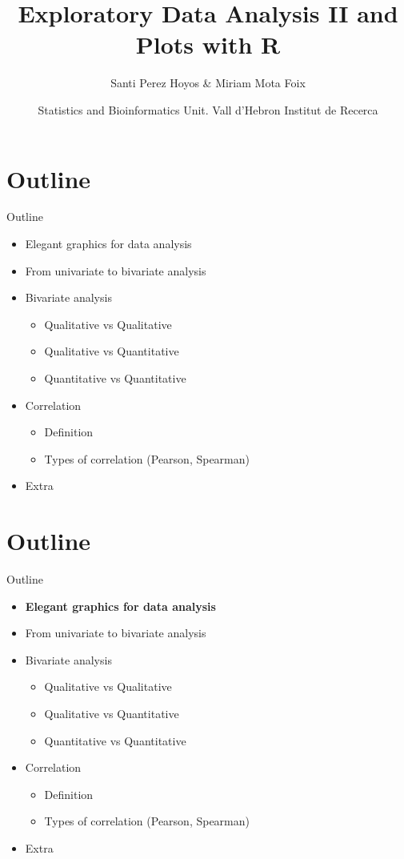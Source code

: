 \documentclass[
  ignorenonframetext,
]{beamer}
\title{Exploratory Data Analysis II and Plots with R}
\author{Santi Perez Hoyos \& Miriam Mota Foix}
\date{Statistics and Bioinformatics Unit. Vall d'Hebron Institut de
Recerca}
\begin{document}
\frame{\titlepage}

\section{Outline}\label{outline}

\begin{frame}{Outline}
\begin{itemize}
\item
  Elegant graphics for data analysis
\item
  From univariate to bivariate analysis
\item
  Bivariate analysis

  \begin{itemize}
  \item
    Qualitative vs Qualitative
  \item
    Qualitative vs Quantitative
  \item
    Quantitative vs Quantitative
  \end{itemize}
\item
  Correlation

  \begin{itemize}
  \item
    Definition
  \item
    Types of correlation (Pearson, Spearman)
  \end{itemize}
\item
  Extra
\end{itemize}
\end{frame}

\section{Outline}\label{outline-1}

\begin{frame}{Outline}
\begin{itemize}
\item
  \textbf{Elegant graphics for data analysis}
\item
  From univariate to bivariate analysis
\item
  Bivariate analysis

  \begin{itemize}
  \item
    Qualitative vs Qualitative
  \item
    Qualitative vs Quantitative
  \item
    Quantitative vs Quantitative
  \end{itemize}
\item
  Correlation

  \begin{itemize}
  \item
    Definition
  \item
    Types of correlation (Pearson, Spearman)
  \end{itemize}
\item
  Extra
\end{itemize}
\end{frame}
\end{document}
